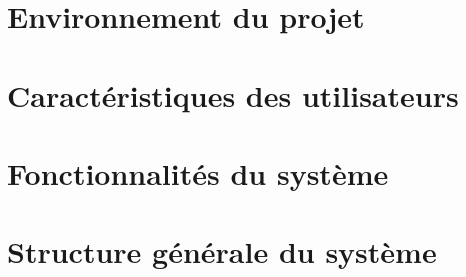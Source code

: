 \section{Environnement du projet}
\section{Caractéristiques des utilisateurs}
\section{Fonctionnalités du système}
\section{Structure générale du système}